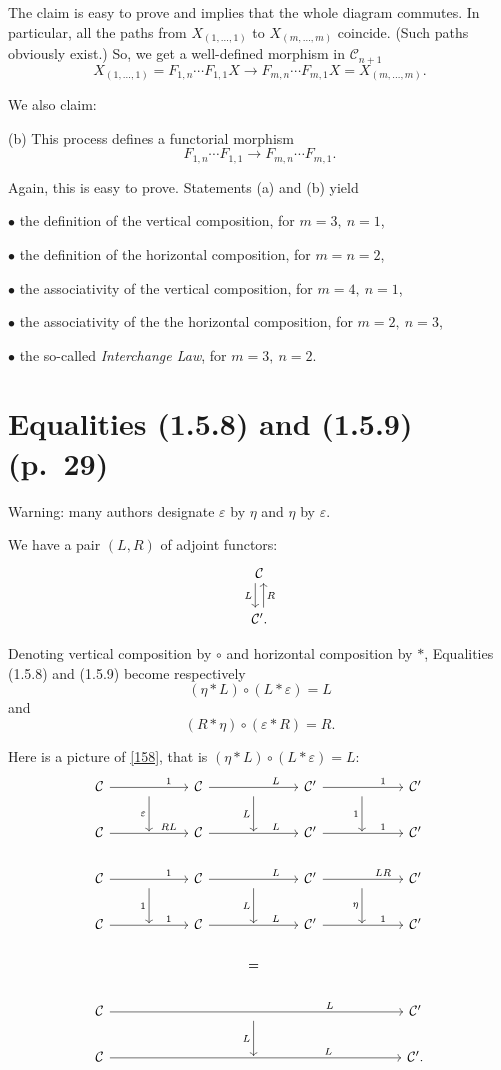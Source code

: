 \documentclass[12pt]{article}
\theoremstyle{remark}
\theoremstyle{definition}
\newcommand{\bu}{\bullet}
\newcommand{\n}{\noindent}
\newcommand{\C}{\mathcal C}
\newcommand{\e}{\varepsilon}
\newcommand{\be}{\begin{equation}}
\newcommand{\ee}{\end{equation}}
\begin{document}
The claim is easy to prove and implies that the whole diagram commutes. In particular, all the paths from $X_{(1,\dots,1)}$ to $X_{(m,\dots,m)}$ coincide. (Such paths obviously exist.) So, we get a well-defined morphism in $\C_{n+1}$
$$
X_{(1,\dots,1)}=F_{1,n}\cdots F_{1,1}X\to F_{m,n}\cdots F_{m,1}X=X_{(m,\dots,m)}.
$$

We also claim: 

\n(b) This process defines a functorial morphism 
$$
F_{1,n}\cdots F_{1,1}\to F_{m,n}\cdots F_{m,1}.
$$

Again, this is easy to prove. Statements (a) and (b) yield 

\n$\bu$ the definition of the vertical composition, for $m=3,\ n=1$,

\n$\bu$ the definition of the horizontal composition, for $m=n=2$,

\n$\bu$ the associativity of the vertical composition, for $m=4,\ n=1$,

\n$\bu$ the associativity of the the horizontal composition, for $m=2,\ n=3$,

\n$\bu$ the so-called \emph{Interchange Law}, for $m=3,\ n=2$.
%
\section{Equalities (1.5.8) and (1.5.9) (p.~29)} %
%
Warning: many authors designate $\e$ by $\eta$ and $\eta$ by $\e$. 

We have a pair $(L,R)$ of adjoint functors: 
$$
\begin{tikzcd}
\C\ar[xshift=-.7ex]{d}[swap]{L}\\ 
\C'.\ar[xshift=.7ex]{u}[swap]{R}
\end{tikzcd}
$$

Denoting vertical composition by $\circ$ and horizontal composition by $*$, Equalities (1.5.8) and (1.5.9) become respectively 
%
\be\label{158} 
(\eta*L)\circ(L*\e)=L
\ee 
% 
and 
%
\be\label{159} 
(R*\eta)\circ(\e*R)=R.
\ee 
% 

Here is a picture of \eqref{158}, that is $(\eta*L)\circ(L*\e)=L$: 
$$
\begin{tikzcd}
%
\C\ar{rr}{}[near end]{1}&\ar{d}[swap]{\e}&\C\ar{rr}{}[near end]{L}&\ar{d}[swap]{L}&\C'\ar{rr}{}[near end]{1}&\ar{d}[swap]{1}&\C'\\ 
%
\C\ar{rr}{}[near end]{RL}&{}&\C\ar{rr}{}[near end]{L}&{}&\C'\ar{rr}{}[near end]{1}&{}&\C'\\ 
%
\C\ar{rr}{}[near end]{1}&\ar{d}[swap]{1}&\C\ar{rr}{}[near end]{L}&\ar{d}[swap]{L}&\C'\ar{rr}{}[near end]{LR}&\ar{d}[swap]{\eta}&\C'\\ 
%
\C\ar{rr}{}[near end]{1}&{}&\C\ar{rr}{}[near end]{L}&{}&\C'\ar{rr}{}[near end]{1}&{}&\C'\\ 
%
&&&=\\ 
%
\C\ar{rrrrrr}[near end]{L}&&&{}\ar{d}[swap]{L}&&&\C'\\
%
\C\ar{rrrrrr}[near end]{L}&&&{}&&&\C'.
%
\end{tikzcd}
$$ 
\end{document}
